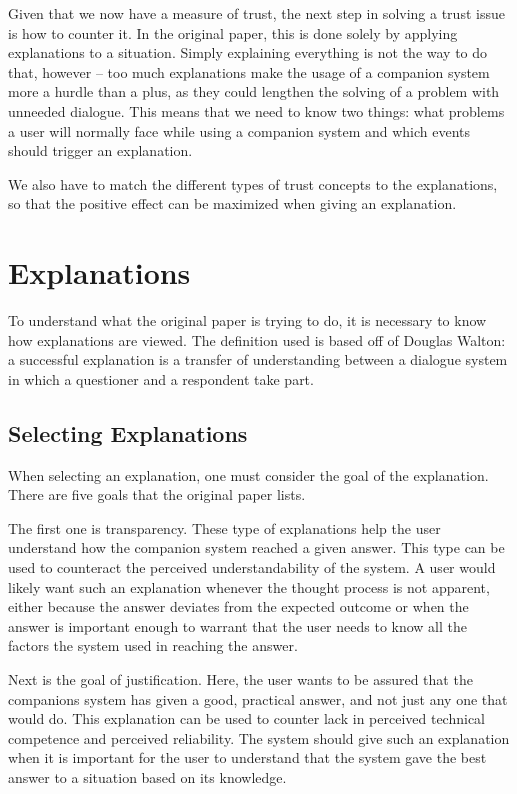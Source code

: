 \documentclass[a4paper]{article}
\begin{document}
Given that we now have a measure of trust, the next step in solving a trust issue is how to counter it. In the original paper, this is done solely by applying explanations to a situation. Simply explaining everything is not the way to do that, however – too much explanations make the usage of a companion system more a hurdle than a plus, as they could lengthen the solving of a problem with unneeded dialogue. This means that we need to know two things: what problems a user will normally face while using a companion system and which events should trigger an explanation.

We also have to match the different types of trust concepts to the explanations, so that the positive effect can be maximized when giving an explanation.

\section{Explanations}

To understand what the original paper is trying to do, it is necessary to know how explanations are viewed. The definition used is based off of Douglas Walton: a successful explanation is a transfer of understanding between a dialogue system in which a questioner and a respondent take part\cite{walton2004new}. 

\subsection{Selecting Explanations}

When selecting an explanation, one must consider the goal of the explanation. There are five goals that the original paper lists.

The first one is transparency. These type of explanations help the user understand how the companion system reached a given answer. This type can be used to counteract the perceived understandability of the system. A user would likely want such an explanation whenever the thought process is not apparent, either because the answer deviates from the expected outcome or when the answer is important enough to warrant that the user needs to know all the factors the system used in reaching the answer.

Next is the goal of justification. Here, the user wants to be assured that the companions system has given a good, practical answer, and not just any one that would do. This explanation can be used to counter lack in perceived technical competence and perceived reliability. The system should give such an explanation when it is important for the user to understand that the system gave the best answer to a situation based on its knowledge.
\end{document}
